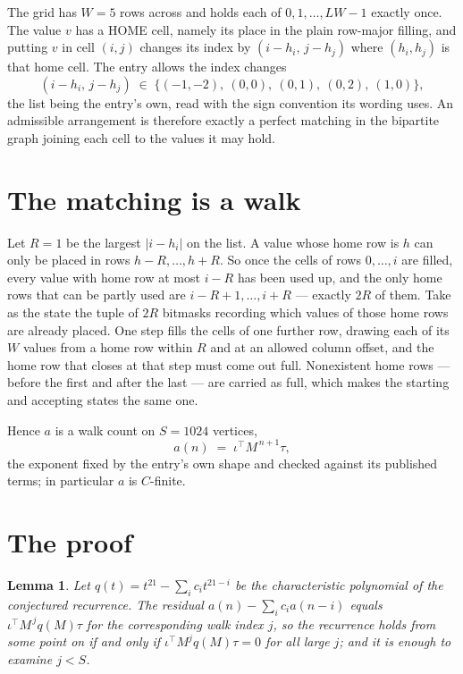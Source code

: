 \documentclass[11pt,a4paper]{article}
\theoremstyle{plain}
\newtheorem{lemma}[theorem]{Lemma}
\theoremstyle{definition}
\begin{document}
The grid has $W=5$ rows across and holds each of $0,1,\dots,LW-1$ exactly once. The value
$v$ has a HOME cell, namely its place in the plain row-major filling, and putting $v$ in cell
$(i,j)$ changes its index by $(i-h_i,\,j-h_j)$ where $(h_i,h_j)$ is that home cell. The entry
allows the index changes
\[
(i-h_i,\,j-h_j)\;\in\;\{(-1,-2),\ (0,0),\ (0,1),\ (0,2),\ (1,0)\},
\]
the list being the entry's own, read with the sign convention its wording uses. An admissible
arrangement is therefore exactly a perfect matching in the bipartite graph joining each cell to
the values it may hold.

\section{The matching is a walk}

Let $R=1$ be the largest $|i-h_i|$ on the list. A value whose home row is $h$ can only be
placed in rows $h-R,\dots,h+R$. So once the cells of rows $0,\dots,i$ are filled, every
value with home row at most $i-R$ has been used up, and the only home rows that can be
partly used are $i-R+1,\dots,i+R$ --- exactly $2R$ of them. Take as the state the tuple of
$2R$ bitmasks recording which values of those home rows are already placed. One step fills
the cells of one further row, drawing each of its $W$ values from a home row within $R$
and at an allowed column offset, and the home row that closes at that step must come out
full. Nonexistent home rows --- before the first and after the last --- are carried as
full, which makes the starting and accepting states the same one.

Hence $a$ is a walk count on $S=1024$ vertices,
\[
a(n)\;=\;\iota^{\!\top}M^{\,n+1}\tau ,
\]
the exponent fixed by the entry's own shape and checked against its published terms; in
particular $a$ is $C$-finite.

\section{The proof}

\begin{lemma}\label{lem:crit}
Let $q(t)=t^{21}-\sum_i c_it^{21-i}$ be the characteristic polynomial of the
conjectured recurrence. The residual $a(n)-\sum_ic_ia(n-i)$ equals
$\iota^{\!\top}M^{\,j}q(M)\tau$ for the corresponding walk index $j$, so the recurrence
holds from some point on if and only if $\iota^{\!\top}M^{j}q(M)\tau=0$ for all large $j$;
and it is enough to examine $j<S$.
\end{lemma}
\end{document}

